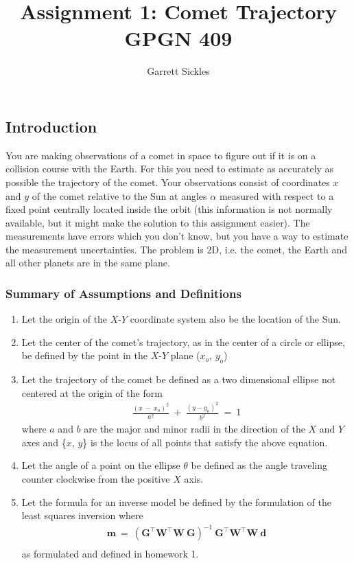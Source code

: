 \documentclass[12pt,runningheads]{article}
\begin{document}

\title{Assignment 1: Comet Trajectory\\GPGN 409}
\author{Garrett Sickles}
\maketitle
\subsection*{Introduction}
You are making observations of a comet in space to figure out if it is on a collision course with the Earth. For this you need to estimate as accurately as possible the trajectory of the comet. Your observations consist of coordinates $x$ and $y$ of the comet relative to the Sun at angles $\alpha$ measured with respect to a fixed point centrally located inside
the orbit (this information is not normally available, but it might make the solution to this assignment easier). The measurements have errors which you don’t know, but you have a way to estimate the measurement uncertainties. The problem is 2D, i.e. the comet, the Earth and all other planets are in the same plane.

\subsubsection*{Summary of Assumptions and Definitions}
\begin{enumerate}
\item Let the origin of the $X$-$Y$ coordinate system also be the location of the Sun.
\item Let the center of the comet's trajectory, as in the center of a circle or ellipse, be defined by the point in the $X$-$Y$ plane ($x_{o}$, $y_{o}$)
\item Let the trajectory of the comet be defined as a two dimensional ellipse not centered at the origin of the form
\begin{align*}
\frac{(x\ -\ x_{o})^2}{a^2}\ +\ \frac{(y-y_{o})^2}{b^2}\  =\ 1
\end{align*}
where $a$ and $b$ are the major and minor radii in the direction of the $X$ and $Y$ axes and \{$x$, $y$\} is the locus of all points that satisfy the above equation.
\item Let the angle of a point on the ellipse $\theta$ be defined as the angle traveling counter clockwise from the positive $X$ axis.
\item Let the formula for an inverse model be defined by the formulation of the least squares inversion where
\begin{align*}
\textbf{m}\ =\ (\textbf{G}^{\intercal}\textbf{W}^{\intercal}\textbf{W}\ \textbf{G})^{-1}\ \textbf{G}^{\intercal}\textbf{W}^{\intercal}\textbf{W}\ \textbf{d} \\
\end{align*}
as formulated and defined in homework 1.
\end{enumerate}
\end{document}
